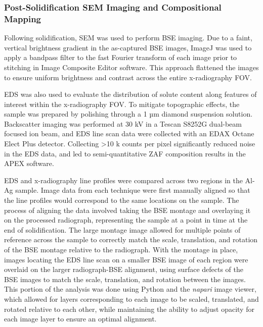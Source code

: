 \subsubsection{Post-Solidification SEM Imaging and Compositional Mapping}
Following solidification, SEM was used to perform BSE imaging. Due to a
faint, vertical brightness gradient in the as-captured BSE images,
ImageJ \cite{imagej} was used to apply a bandpass filter
to the fast Fourier transform
of each image prior to stitching in Image Composite Editor software. This
approach flattened the images to ensure uniform brightness and contrast
across the entire x-radiography FOV.

EDS was also used to evaluate the distribution of solute content along
features of interest within the x-radiography FOV. To mitigate topographic
effects, the sample was prepared by polishing through a 1 µm diamond
suspension solution. Backscatter imaging was performed at 30 kV in a
Tescan S8252G dual-beam focused ion beam, and EDS line scan data were
collected with an EDAX Octane Elect Plus detector.
Collecting \textgreater10 k
counts per pixel significantly reduced noise in the EDS data, and led to
semi-quantitative ZAF composition results in the APEX\texttrademark{} software.

EDS and x-radiography line profiles were compared across two regions in
the Al-Ag sample. Image data from each technique were first manually
aligned so that the line profiles would correspond to the same locations
on the sample. The process of aligning the data involved taking the BSE
montage and overlaying it on the processed radiograph, representing the
sample at a point in time at the end of solidification. The large montage
image allowed for multiple points of reference across the sample to
correctly match the scale, translation, and rotation of the BSE montage
relative to the radiograph. With the montage in place, images locating the
EDS line scan on a smaller BSE image of each region were overlaid on the
larger radiograph-BSE alignment, using surface defects of the BSE images
to match the scale, translation, and rotation between the images. This
portion of the analysis was done using Python and the \textit{napari}
image viewer, which allowed for layers corresponding to each image to be
scaled, translated, and rotated relative to each other, while maintaining the
ability to adjust opacity for each image layer to ensure an optimal
alignment.

